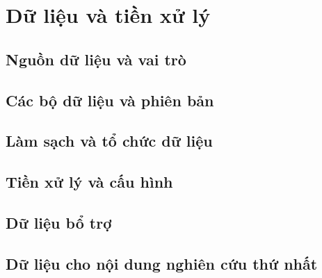 \par{}
\section{Dữ liệu và tiền xử lý}\label{section:data-1}

\par{}
\subsection{Nguồn dữ liệu và vai trò}\label{subsection:data-2}

\par{}
\subsection{Các bộ dữ liệu và phiên bản}\label{subsection:data-3}

\par{}
\subsection{Làm sạch và tổ chức dữ liệu}\label{subsection:data-4}

\par{}
\subsection{Tiền xử lý và cấu hình}\label{subsection:data-5}

\par{}
\subsection{Dữ liệu bổ trợ}\label{subsection:data-6}

\par{}
\subsection{Dữ liệu cho nội dung nghiên cứu thứ nhất}\label{subsection:data-7}

